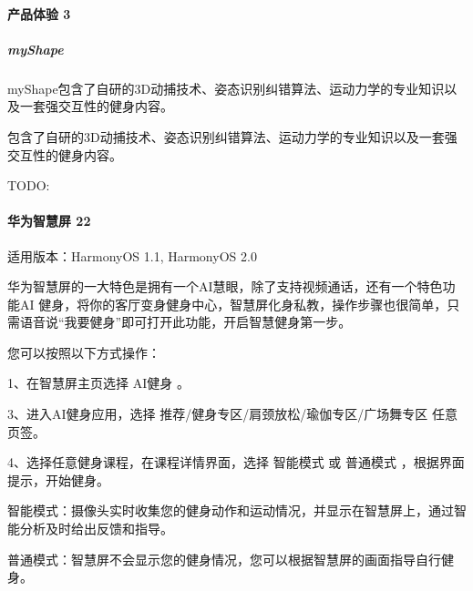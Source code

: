 \documentclass[letterpaper,11pt,english]{sphinxmanual}
\begin{document}
\paragraph{产品体验 3\sphinxfootnotemark[684]}
\label{\detokenize{chapter_project/AI_fit:id5}}%
\begin{footnotetext}[684]\sphinxAtStartFootnote
{}
%
\end{footnotetext}\ignorespaces 

\subparagraph{myShape}
\label{\detokenize{chapter_project/AI_fit:myshape}}

myShape包含了自研的3D动捕技术、姿态识别纠错算法、运动力学的专业知识以及一套强交互性的健身内容。

包含了自研的3D动捕技术、姿态识别纠错算法、运动力学的专业知识以及一套强交互性的健身内容。

TODO:


\paragraph{华为智慧屏 22\sphinxfootnotemark[685]}
\label{\detokenize{chapter_project/AI_fit:id6}}%
\begin{footnotetext}[685]\sphinxAtStartFootnote
{}
%
\end{footnotetext}\ignorespaces 
适用版本：HarmonyOS 1.1, HarmonyOS 2.0

华为智慧屏的一大特色是拥有一个AI慧眼，除了支持视频通话，还有一个特色功能AI
健身，将你的客厅变身健身中心，智慧屏化身私教，操作步骤也很简单，只需语音说“我要健身”即可打开此功能，开启智慧健身第一步。%
\begin{footnote}[686]\sphinxAtStartFootnote
{}
%
\end{footnote}

您可以按照以下方式操作：

1、在智慧屏主页选择 AI健身 。

3、进入AI健身应用，选择 推荐/健身专区/肩颈放松/瑜伽专区/广场舞专区
任意页签。

4、选择任意健身课程，在课程详情界面，选择 智能模式 或 普通模式
，根据界面提示，开始健身。

智能模式：摄像头实时收集您的健身动作和运动情况，并显示在智慧屏上，通过智能分析及时给出反馈和指导。

普通模式：智慧屏不会显示您的健身情况，您可以根据智慧屏的画面指导自行健身。
\end{document}
